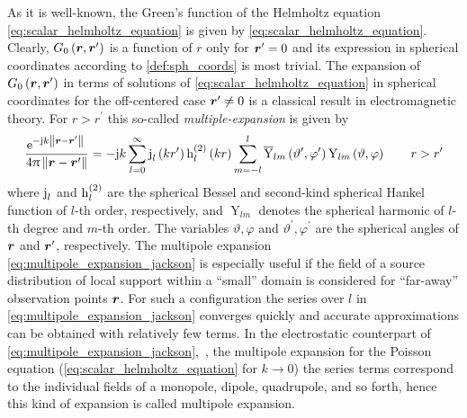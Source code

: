 As it is well-known, the Green's function of the Helmholtz equation
\eqref{eq:scalar_helmholtz_equation} is given by
\eqref{eq:scalar_helmholtz_equation}.
Clearly, $G_0\left(\robs, \rsrc\right)$ is a function of $r$ only for
$\rsrc = 0$ and its expression in spherical coordinates according to
\cref{def:sph_coords} is most trivial.
The expansion of $G_0\left(\robs, \rsrc\right)$ in terms of solutions of
\eqref{eq:scalar_helmholtz_equation} in spherical coordinates for the
off-centered case $\rsrc \neq 0$ is a classical result in electromagnetic
theory.
For $r > r^\prime$ this so-called \emph{multiple-expansion} is given by
\cite[492]{Jackson2013}
\begin{equation}\label{eq:multipole_expansion_jackson}
	\frac{\exp{-\im k \rdiffNorm}}{4\pi \rdiffNorm} = 
	-\im k \sum_{l = 0}^{\infty}
	\sphbesselj{l} \left(k r^\prime\right)
	\sphbesselh{2}{l} \left(k r\right)
	\sum_{m = -l}^{l}
	\complexConjugate{\operatorname{Y}}_{l m}
	\left( \vartheta^\prime, \varphi^\prime \right) 
	\operatorname{Y}_{l m}
	\left( \vartheta, \varphi\right)
	\qquad
	r > r^\prime
\end{equation}
where $\sphbesselj{l}$ and $\sphbesselh{2}{l}$ are the spherical Bessel and
second-kind spherical Hankel function of $l$-th order, respectively, and
$\operatorname{Y}_{l m}$ denotes the spherical harmonic of $l$-th degree and
$m$-th order.
The variables $\vartheta, \varphi$ and $\vartheta^\prime, \varphi^\prime$ are
the spherical angles of $\robs$ and $\rsrc$, respectively.
The multipole expansion \eqref{eq:multipole_expansion_jackson} is especially
useful if the field of a source distribution of local support within a
\enquote{small} domain is considered for \enquote{far-away} observation points
$\robs$.
For such a configuration the series over $l$ in
\eqref{eq:multipole_expansion_jackson} converges quickly and accurate
approximations can be obtained with relatively few terms.
In the electrostatic counterpart of \eqref{eq:multipole_expansion_jackson},~\ie,
the multipole expansion for the Poisson equation
(\eqref{eq:scalar_helmholtz_equation} for $k \to 0$) the series terms correspond
to the individual fields of a monopole, dipole, quadrupole,
and so forth, hence this kind of expansion is called multipole expansion.

